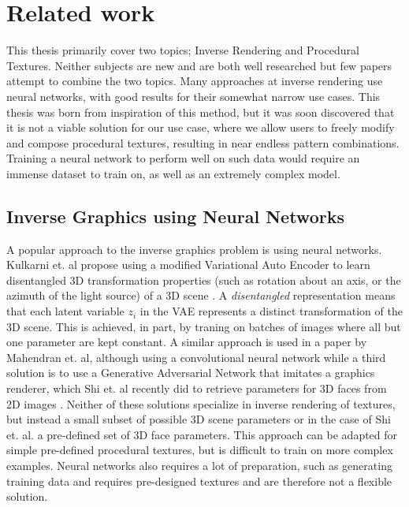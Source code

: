 \section{Related work}

This thesis primarily cover two topics; Inverse Rendering and Procedural Textures. Neither subjects are new and are both well researched but few papers attempt to combine the two topics. Many approaches at inverse rendering use neural networks, with good results for their somewhat narrow use cases. This thesis was born from inspiration of this method, but it was soon discovered that it is not a viable solution for our use case, where we allow users to freely modify and compose procedural textures, resulting in near endless pattern combinations. Training a neural network to perform well on such data would require an immense dataset to train on, as well as an extremely complex model.

\subsection{Inverse Graphics using Neural Networks}

A popular approach to the inverse graphics problem is using neural networks. Kulkarni et. al propose using a modified Variational Auto Encoder to learn disentangled 3D transformation properties (such as rotation about an axis, or the azimuth of the light source) of a 3D scene \cite{kulkarni_2015_deep}. A \textit{disentangled} representation means that each latent variable $z_i$ in the VAE represents a distinct transformation of the 3D scene. This is achieved, in part, by traning on batches of images where all but one parameter are kept constant. A similar approach is used in a paper by Mahendran et. al, although using a convolutional neural network \cite{mahendran_2017_3d} while a third solution is to use a Generative Adversarial Network that imitates a graphics renderer, which Shi et. al recently did to retrieve parameters for 3D faces from 2D images \cite{shi_2019_facetoparameter}. Neither of these solutions specialize in inverse rendering of textures, but instead a small subset of possible 3D scene parameters or in the case of Shi et. al. a pre-defined set of 3D face parameters. This approach can be adapted for simple pre-defined procedural textures, but is difficult to train on more complex examples. Neural networks also requires a lot of preparation, such as generating training data and requires pre-designed textures and are therefore not a flexible solution.


